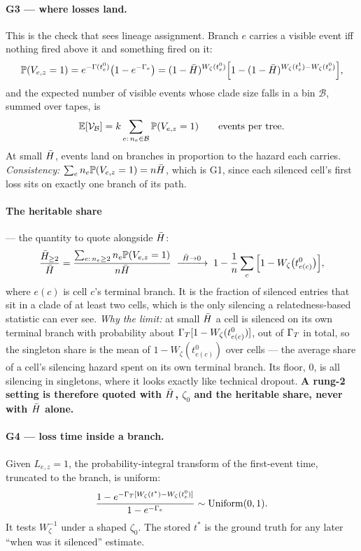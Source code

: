 \paragraph{G3 --- where losses land.} This is the check that sees lineage assignment. Branch $e$ carries
a visible event iff nothing fired above it and something fired on it:
\begin{equation}
  \mathbb{P}(V_{e,z}=1)=e^{-\Gamma(t_e^0)}\big(1-e^{-\Gamma_e}\big)
  =(1-\bar H)^{W_\zeta(t_e^0)}\Big[1-(1-\bar H)^{W_\zeta(t_e^1)-W_\zeta(t_e^0)}\Big],
  \label{eq:G3}
\end{equation}
and the expected number of visible events whose clade size falls in a bin $\mathcal B$, summed over
tapes, is
\begin{equation}
  \mathbb{E}[\mathcal V_{\mathcal B}]=k\sum_{e:\,n_e\in\mathcal B}\mathbb{P}(V_{e,z}=1)\qquad\text{events per tree.}
  \label{eq:G3bin}
\end{equation}
At small $\bar H$, events land on branches in proportion to
the hazard each carries. \emph{Consistency:} $\sum_en_e\mathbb{P}(V_{e,z}=1)=n\bar H$, which is G1, since each
silenced cell's first loss sits on exactly one branch of its path.

\paragraph{The heritable share} --- the quantity to quote alongside $\bar H$:
\begin{equation}
  \frac{\Hbar_{\ge2}}{\Hbar}=\frac{\sum_{e:\,n_e\ge2}n_e\Prob(V_{e,z}=1)}{n\Hbar}
  \;\xrightarrow{\ \Hbar\to0\ }\;1-\frac1n\sum_c\Big[1-W_\zeta\big(t^0_{e(c)}\big)\Big],
  \label{eq:hershare}
\end{equation}
where $e(c)$ is cell $c$'s terminal branch. It is the fraction of silenced entries that sit in a clade
of at least two cells, which is the only silencing a relatedness-based statistic can ever see.
\emph{Why the limit:} at small $\bar H$ a cell is silenced on its own terminal branch with probability
about $\Gamma_T[1-W_\zeta(t^0_{e(c)})]$, out of $\Gamma_T$ in total, so the singleton share is the mean of
$1-W_\zeta(t^0_{e(c)})$ over cells --- the average share of a cell's silencing hazard spent on its own
terminal branch. Its floor, $0$, is all silencing in singletons, where it looks exactly like technical
dropout. \textbf{A rung-2 setting is therefore quoted with $\bar H$, $\zeta_0$ and the heritable share,
never with $\bar H$ alone.}

\paragraph{G4 --- loss time inside a branch.} Given $L_{e,z}=1$, the probability-integral transform of
the first-event time, truncated to the branch, is uniform:
\begin{equation}
  \frac{1-e^{-\Gamma_T[W_\zeta(t^*)-W_\zeta(t_e^0)]}}{1-e^{-\Gamma_e}}\sim\operatorname{Uniform}(0,1).
  \label{eq:G4}
\end{equation}
It tests $W_\zeta^{-1}$ under a shaped $\zeta_0$. The stored $t^*$ is the ground truth for any later
``when was it silenced'' estimate.

